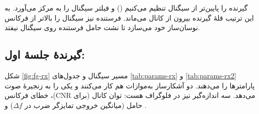 \documentclass[a4paper,11pt]{article}
\begin{document}
\begin{notebox}
گیرنده را
پایین‌تر از سیگنال تنظیم می‌کنیم
()
و فیلتر
سیگنال را به مرکز می‌آورد. به این ترتیب قلهٔ
گیرنده بیرون از کانال می‌ماند. فرستنده نیز سیگنال را
بالاتر از فرکانس نوسان‌ساز خود می‌سازد تا نشت حامل فرستنده روی سیگنال نیفتد.
\end{notebox}

\subsection{گیرندهٔ جلسهٔ اول: }
شکل
\ref{fig:fg-rx}
مسیر سیگنال و جدول‌های
\ref{tab:params-rx}
و
\ref{tab:params-rx2}
پارامترها را می‌دهند. دو آشکارساز به‌موازات هم کار می‌کنند و
یکی را به زنجیرهٔ صوت می‌دهد. سه اندازه‌گیر نیز در فلوگراف هست: توان کانال (برای
$\mathrm{CNR}$)،
خطای فرکانس حامل (میانگین خروجی تمایزگر ضرب در
$\Delta f$)
و
.
\end{document}
